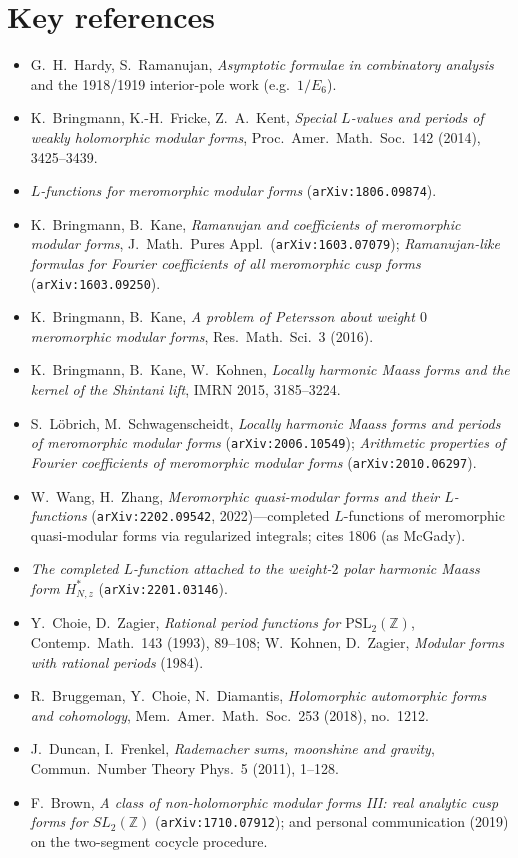 \documentclass[11pt]{article}
\newcommand{\Z}{\mathbb{Z}}
\begin{document}
\section*{Key references}
\begin{itemize}[leftmargin=1.4em]
\item G.~H.~Hardy, S.~Ramanujan, \emph{Asymptotic formulae in combinatory analysis} and
the 1918/1919 interior-pole work (e.g.\ $1/E_6$).
\item K.~Bringmann, K.-H.~Fricke, Z.~A.~Kent, \emph{Special $L$-values and periods of
weakly holomorphic modular forms}, Proc.\ Amer.\ Math.\ Soc.\ 142 (2014), 3425--3439.
\item [1806] \emph{$L$-functions for meromorphic modular forms} (\texttt{arXiv:1806.09874}).
\item K.~Bringmann, B.~Kane, \emph{Ramanujan and coefficients of meromorphic modular
forms}, J.\ Math.\ Pures Appl.\ (\texttt{arXiv:1603.07079}); \emph{Ramanujan-like formulas
for Fourier coefficients of all meromorphic cusp forms} (\texttt{arXiv:1603.09250}).
\item K.~Bringmann, B.~Kane, \emph{A problem of Petersson about weight $0$ meromorphic
modular forms}, Res.\ Math.\ Sci.\ 3 (2016).
\item K.~Bringmann, B.~Kane, W.~Kohnen, \emph{Locally harmonic Maass forms and the kernel
of the Shintani lift}, IMRN 2015, 3185--3224.
\item S.~L\"obrich, M.~Schwagenscheidt, \emph{Locally harmonic Maass forms and periods of
meromorphic modular forms} (\texttt{arXiv:2006.10549}); \emph{Arithmetic properties of
Fourier coefficients of meromorphic modular forms} (\texttt{arXiv:2010.06297}).
\item W.~Wang, H.~Zhang, \emph{Meromorphic quasi-modular forms and their $L$-functions}
(\texttt{arXiv:2202.09542}, 2022)---completed $L$-functions of meromorphic quasi-modular
forms via regularized integrals; cites 1806 (as McGady).
\item \emph{The completed $L$-function attached to the weight-$2$ polar harmonic Maass form
$H^{*}_{N,z}$} (\texttt{arXiv:2201.03146}).
\item Y.~Choie, D.~Zagier, \emph{Rational period functions for $\mathrm{PSL}_2(\Z)$},
Contemp.\ Math.\ 143 (1993), 89--108; W.~Kohnen, D.~Zagier, \emph{Modular forms with
rational periods} (1984).
\item R.~Bruggeman, Y.~Choie, N.~Diamantis, \emph{Holomorphic automorphic forms and
cohomology}, Mem.\ Amer.\ Math.\ Soc.\ 253 (2018), no.\ 1212.
\item J.~Duncan, I.~Frenkel, \emph{Rademacher sums, moonshine and gravity}, Commun.\
Number Theory Phys.\ 5 (2011), 1--128.
\item F.~Brown, \emph{A class of non-holomorphic modular forms III: real analytic cusp
forms for $SL_2(\Z)$} (\texttt{arXiv:1710.07912}); and personal communication (2019) on
the two-segment cocycle procedure.
\end{itemize}
\end{document}

